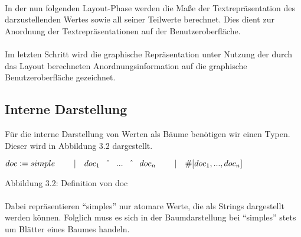 \documentclass[12pt,a4paper]{article}
\begin{document}
\paragraph{}    

In der nun folgenden Layout-Phase werden die Ma\ss e der 
Textrepr\"asentation des darzustellenden Wertes sowie 
all seiner Teilwerte berechnet. Dies dient zur Anordnung 
der Textrepr\"asentationen auf der Benutzeroberfl\"ache.

\paragraph{}

Im letzten Schritt wird die graphische Repr\"asentation 
unter Nutzung der durch das Layout berechneten Anordnungsinformation 
auf die graphische Benutzeroberfl\"ache gezeichnet. 

\subsection{Interne Darstellung}

\label{intern}

F\"ur die interne Darstellung von Werten als B\"aume ben\"otigen wir einen 
Typen. Dieser wird in Abbildung 3.2 dargestellt.\\[1mm]

\begin{minipage}{15cm}
\begin{math}
doc :=  simple \newline
\hspace*{8mm} | \quad  doc_{1} \quad \hat{} \quad ... \quad \hat{} 
                \quad doc_{n} \newline       
\hspace*{8mm} | \quad \# \lbrack doc_{1}, ... , doc_{n}\rbrack 
\end{math} \newline
\end{minipage}
Abbildung 3.2: Definition von doc

\paragraph{}

Dabei repr\"asentieren ``simples'' nur atomare Werte, die als Strings 
dargestellt werden k\"onnen. Folglich muss es sich in der Baumdarstellung 
bei ``simples'' stets um Bl\"atter eines Baumes handeln.

\paragraph{}
\end{document}
